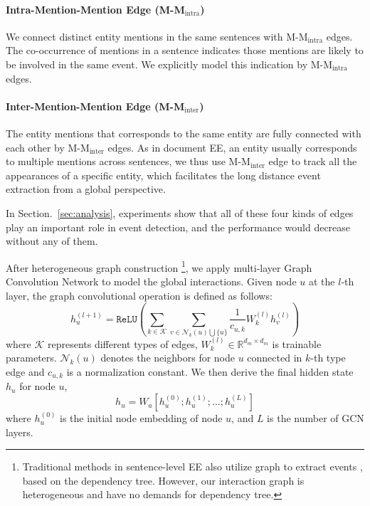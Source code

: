 \documentclass[11pt,a4paper]{article}
\begin{document}
    \paragraph{Intra-Mention-Mention Edge (M-M$_{\mathrm{intra}}$)} We connect distinct entity mentions in the same sentences with M-M$_{\mathrm{intra}}$ edges. 
    The co-occurrence of mentions in a sentence indicates those mentions are likely to be involved in the same event. 
    We explicitly model this indication by M-M$_{\mathrm{intra}}$ edges.
    \paragraph{Inter-Mention-Mention Edge (M-M$_{\mathrm{inter}}$)}The entity mentions that corresponds to the same entity are fully connected with each other by M-M$_{\mathrm{inter}}$ edges. 
    As in document EE, an entity usually corresponds to multiple mentions across sentences, we thus use M-M$_{\mathrm{inter}}$ edge to track all the appearances of a specific entity, which facilitates the long distance event extraction from a global perspective. 

In Section.~\ref{sec:analysis}, experiments show that all of these four kinds of edges play an important role in event detection, and the performance would decrease without any of them.

After heterogeneous graph construction 
\footnote{Traditional methods in sentence-level EE also utilize graph to extract events \citep{liu-etal-2018-jointly, yan-etal-2019-event}, based on the dependency tree.
However, our interaction graph is heterogeneous and have no demands for dependency tree.
}, 
we apply multi-layer Graph Convolution Network \citep{kipf2017semi} to model the global interactions. 
Given node $u$ at the $l$-th layer, the graph convolutional operation is defined as follows:
\begin{equation*}
       h_{u}^{(l + 1)} = \texttt{ReLU} \left(\sum_{k\in\mathcal{K}}\sum_{v\in\mathcal{N}_k(u) \bigcup \{u\}} \frac{1}{c_{u,k}} W^{(l)}_k h_{v}^{(l)} \right)
\end{equation*}
where $\mathcal{K}$ represents different types of edges, $W^{(l)}_k\in \mathbb{R}^{d_m \times d_m}$ is trainable parameters.
$\mathcal{N}_k(u)$ denotes the neighbors for node $u$ connected in $k$-th type edge and $c_{u,k}$ is a normalization constant.
We then derive the final hidden state $h_u$ for node $u$,
\begin{equation*}
    h_u = W_a[h_{u}^{(0)}; h_{u}^{(1)}; \ldots; h_{u}^{(L)}]
\end{equation*}
where $h^{(0)}_u$ is the initial node embedding of node $u$, and $L$ is the number of GCN layers.
\end{document}
